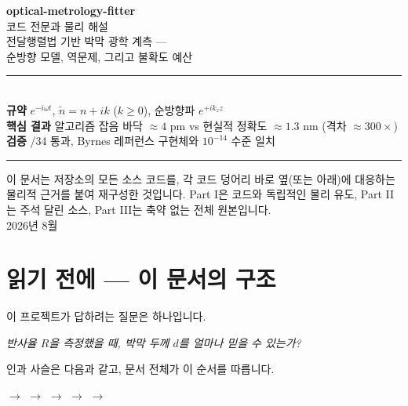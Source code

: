 \documentclass[10pt,a4paper]{article}
\newcommand{\nt}{\tilde n}
\begin{document}
\begin{titlepage}
\vspace*{2.2cm}
{\Huge\bfseries\color{accent} optical-metrology-fitter}\\[6pt]
{\LARGE 코드 전문과 물리 해설}\\[22pt]
{\large 전달행렬법 기반 박막 광학 계측 —\\ 순방향 모델, 역문제, 그리고 불확도 예산}\\[30pt]
\rule{\textwidth}{0.7pt}\\[10pt]
{\normalsize
\textbf{규약} \quad $e^{-i\omega t}$, \quad $\nt = n + ik$ ($k\ge 0$), \quad 순방향파 $e^{+ik_z z}$\\[4pt]
\textbf{핵심 결과} \quad 알고리즘 잡음 바닥 $\approx 4$ pm \quad vs \quad 현실적 정확도 $\approx 1.3$ nm \quad (격차 $\approx 300\times$)\\[4pt]
\textbf{검증} /34 통과, Byrnes 레퍼런스 구현체와 $10^{-14}$ 수준 일치
}\\[8pt]
\rule{\textwidth}{0.7pt}

\vfill
{\footnotesize\color{cmt}
이 문서는 저장소의 모든 소스 코드를, 각 코드 덩어리 바로 옆(또는 아래)에 대응하는 물리적 근거를 붙여 재구성한 것입니다.
Part I은 코드와 독립적인 물리 유도, Part II는 주석 달린 소스, Part III는 축약 없는 전체 원본입니다.\\[6pt]
2026년 8월}
\end{titlepage}

\tableofcontents
\newpage

\section{읽기 전에 — 이 문서의 구조}

이 프로젝트가 답하려는 질문은 하나입니다.

\begin{center}
\emph{반사율 $R$을 측정했을 때, 박막 두께 $d$를 얼마나 믿을 수 있는가?}
\end{center}

인과 사슬은 다음과 같고, 문서 전체가 이 순서를 따릅니다.

\vspace{4pt}
\begin{center}
 $\to$  $\to$  $\to$  $\to$  $\to$ 
\end{center}
\vspace{4pt}
\end{document}
